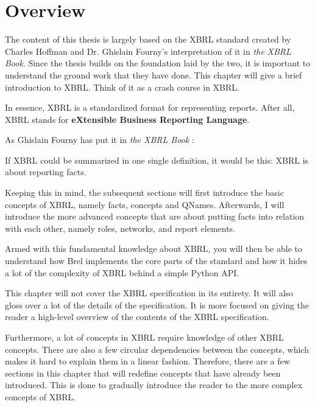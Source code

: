 \section{Overview}

The content of this thesis is largely based on the XBRL standard\cite{xbrl} created by Charles Hoffman and Dr. Ghislain Fourny's interpretation of it in \textit{the XBRL Book}\cite{fourny2023xbrl}.
Since the thesis builds on the foundation laid by the two, it is important to understand the ground work that they have done.
This chapter will give a brief introduction to XBRL.
Think of it as a crash course in XBRL.

In essence, XBRL is a standardized format for representing reports.
After all, XBRL stands for \textbf{eXtensible Business Reporting Language}.\cite{xbrl}

As Ghislain Fourny has put it in \textit{the XBRL Book} \cite{fourny2023xbrl}:
\begin{displayquote}
    If XBRL could be summarized in one single definition, it would be this:
    XBRL is about reporting facts.
\end{displayquote}

Keeping this in mind, the subsequent sections will first introduce the basic concepts of XBRL, namely facts, concepts and QNames.
Afterwards, I will introduce the more advanced concepts that are about putting facts into relation with each other, namely roles, networks, and report elements.

Armed with this fundamental knowledge about XBRL, 
you will then be able to understand how Brel implements the core parts of the standard and how it hides a lot of the complexity of XBRL behind a simple Python API.

This chapter will not cover the XBRL specification in its entirety.
It will also gloss over a lot of the details of the specification.
It is more focused on giving the reader a high-level overview of the contents of the XBRL specification.

Furthermore, a lot of concepts in XBRL require knowledge of other XBRL concepts.
There are also a few circular dependencies between the concepts, which makes it hard to explain them in a linear fashion.
Therefore, there are a few sections in this chapter that will redefine concepts that have already been introduced.
This is done to gradually introduce the reader to the more complex concepts of XBRL.
